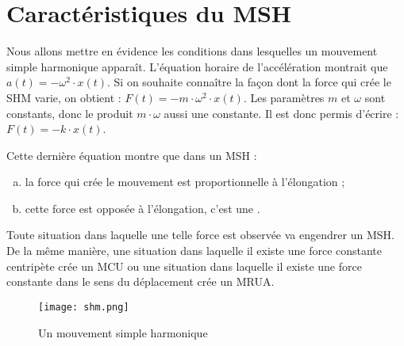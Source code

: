 \newpage

\section{Caractéristiques du MSH}
Nous allons mettre en évidence les conditions dans lesquelles un mouvement simple harmonique apparaît.
L'équation horaire de l'accélération montrait que \(a(t)=- \omega ^2 \cdot  x(t)\). Si on souhaite connaître la façon dont la force qui crée le SHM varie, on obtient : \(F(t)=- m \cdot \omega ^2 \cdot x(t)\). Les paramètres \(m\) et \(\omega\) sont constants, donc le produit \(m \cdot \omega\) aussi une constante. Il est donc permis d'écrire : \(F(t)=- k \cdot x(t)\).

Cette dernière équation montre que dans un MSH :
\begin{enumerate}[(a)]
    \item la force qui crée le mouvement est proportionnelle à l'élongation ;
    \item cette force est opposée à l'élongation, c'est une .
\end{enumerate}


Toute situation dans laquelle une telle force est observée va engendrer un MSH. De la même manière, une situation dans laquelle il existe une force constante centripète crée un MCU ou une situation dans laquelle il existe une force constante dans le sens du déplacement crée un MRUA.


\begin{figure}[h!]
    \centering
    \texttt{[image: shm.png]}
    \caption{Un mouvement simple harmonique}
    \label{shm}
\end{figure}